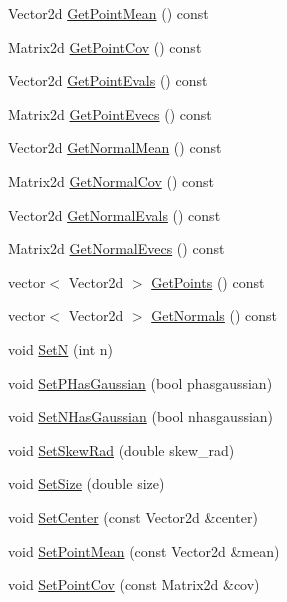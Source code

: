 \begin{DoxyCompactItemize}
\item 
Vector2d \hyperlink{classNDTCell_a61b2a9500daf0d912bfd904cbf169762}{Get\+Point\+Mean} () const
\item 
Matrix2d \hyperlink{classNDTCell_a0766397f0999272036edab26866c7c03}{Get\+Point\+Cov} () const
\item 
Vector2d \hyperlink{classNDTCell_abdebdcf6e0cfd0715efdad6b6aebd5be}{Get\+Point\+Evals} () const
\item 
Matrix2d \hyperlink{classNDTCell_aabd7f47d9683071303a431ebd640797a}{Get\+Point\+Evecs} () const
\item 
Vector2d \hyperlink{classNDTCell_ac4567367161fe878a2fe86b8f29aba04}{Get\+Normal\+Mean} () const
\item 
Matrix2d \hyperlink{classNDTCell_a8ea2ea0b713a10d39b3f640d42cdc055}{Get\+Normal\+Cov} () const
\item 
Vector2d \hyperlink{classNDTCell_a352b15be7318d1bccf60029e479491e2}{Get\+Normal\+Evals} () const
\item 
Matrix2d \hyperlink{classNDTCell_a15edc678da9fcc206a2a1697bc893463}{Get\+Normal\+Evecs} () const
\item 
vector$<$ Vector2d $>$ \hyperlink{classNDTCell_ad1e93479cbbec1b90d7eec8cb9b486a1}{Get\+Points} () const
\item 
vector$<$ Vector2d $>$ \hyperlink{classNDTCell_a04b9a2c831ecb8bcd5c0f5a1e183a248}{Get\+Normals} () const
\item 
void \hyperlink{classNDTCell_a6d75aba8fc79b0f93da8f814114d8bd2}{SetN} (int n)
\item 
void \hyperlink{classNDTCell_a6611090c8ef12f754032b72c5f17d795}{Set\+P\+Has\+Gaussian} (bool phasgaussian)
\item 
void \hyperlink{classNDTCell_a5e0af0c81b4efc61bde2616993055b14}{Set\+N\+Has\+Gaussian} (bool nhasgaussian)
\item 
void \hyperlink{classNDTCell_aaa8e07701412d6c47e8d3f9172a4d86c}{Set\+Skew\+Rad} (double skew\+\_\+rad)
\item 
void \hyperlink{classNDTCell_a304509d07db69d380e60e474932ded1b}{Set\+Size} (double size)
\item 
void \hyperlink{classNDTCell_aa99d66a755f591c7d0859d3203e9fb5c}{Set\+Center} (const Vector2d \&center)
\item 
void \hyperlink{classNDTCell_a3c3254891a543255f7beede3ed4c40b5}{Set\+Point\+Mean} (const Vector2d \&mean)
\item 
void \hyperlink{classNDTCell_a6d94d720f43f5ce74b9937668c5ca305}{Set\+Point\+Cov} (const Matrix2d \&cov)

\end{DoxyCompactItemize}
